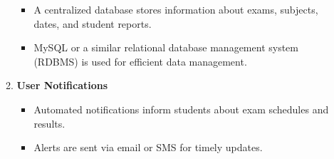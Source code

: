 \documentclass[14pt]{article}
\begin{document}
\begin{enumerate}
\begin{enumerate}
\begin{itemize}
\item A centralized database stores information about exams, subjects, dates, and student reports.
\item MySQL or a similar relational database management system (RDBMS) is used for efficient data management.
\end{itemize}
\item \textbf{User Notifications}
\begin{itemize}
\item Automated notifications inform students about exam schedules and results.
\item Alerts are sent via email or SMS for timely updates.
\end{itemize}
\end{enumerate}



\end{enumerate}
\end{document}
